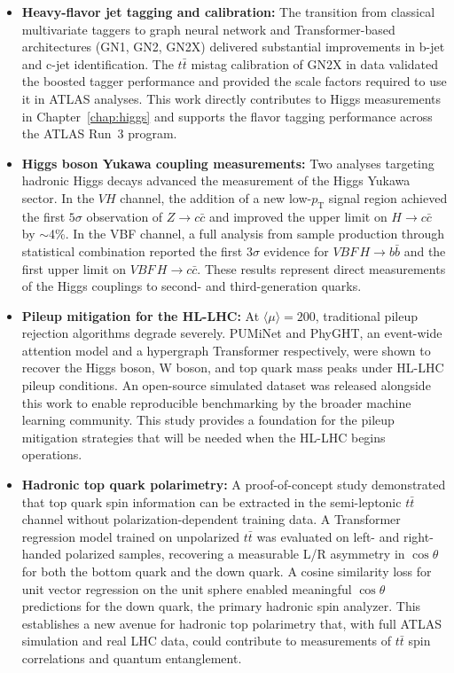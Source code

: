 \begin{itemize}
    \item \textbf{Heavy-flavor jet tagging and calibration:} The transition from classical multivariate taggers to graph neural network and Transformer-based architectures (GN1, GN2, GN2X) delivered substantial improvements in b-jet and c-jet identification. The $t\bar{t}$ mistag calibration of GN2X in data validated the boosted tagger performance and provided the scale factors required to use it in ATLAS analyses. This work directly contributes to Higgs measurements in Chapter~\ref{chap:higgs} and supports the flavor tagging performance across the ATLAS Run~3 program.

    \item \textbf{Higgs boson Yukawa coupling measurements:} Two analyses targeting hadronic Higgs decays advanced the measurement of the Higgs Yukawa sector. In the $VH$ channel, the addition of a new low-$p_\mathrm{T}$ signal region achieved the first $5\sigma$ observation of $Z \to c\bar{c}$ and improved the upper limit on $H \to c\bar{c}$ by $\sim$4\%. In the VBF channel, a full analysis from sample production through statistical combination reported the first $3\sigma$ evidence for $VBF\,H \to b\bar{b}$ and the first upper limit on $VBF\,H \to c\bar{c}$. These results represent direct measurements of the Higgs couplings to second- and third-generation quarks.

    \item \textbf{Pileup mitigation for the HL-LHC:} At $\langle\mu\rangle = 200$, traditional pileup rejection algorithms degrade severely. PUMiNet and PhyGHT, an event-wide attention model and a hypergraph Transformer respectively, were shown to recover the Higgs boson, W boson, and top quark mass peaks under HL-LHC pileup conditions. An open-source simulated dataset was released alongside this work to enable reproducible benchmarking by the broader machine learning community. This study provides a foundation for the pileup mitigation strategies that will be needed when the HL-LHC begins operations.

    \item \textbf{Hadronic top quark polarimetry:} A proof-of-concept study demonstrated that top quark spin information can be extracted in the semi-leptonic $t\bar{t}$ channel without polarization-dependent training data. A Transformer regression model trained on unpolarized $t\bar{t}$ was evaluated on left- and right-handed polarized samples, recovering a measurable L/R asymmetry in $\cos\theta$ for both the bottom quark and the down quark. A cosine similarity loss for unit vector regression on the unit sphere enabled meaningful $\cos\theta$ predictions for the down quark, the primary hadronic spin analyzer. This establishes a new avenue for hadronic top polarimetry that, with full ATLAS simulation and real LHC data, could contribute to measurements of $t\bar{t}$ spin correlations and quantum entanglement.
\end{itemize}

